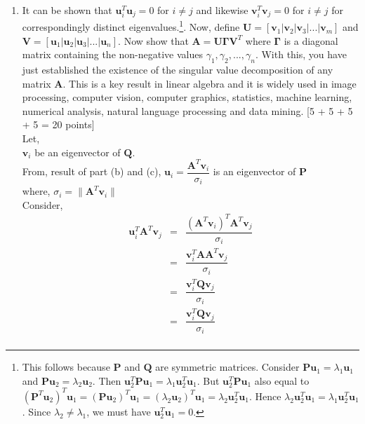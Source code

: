 \documentclass[11pt]{article}
\begin{document}
\begin{enumerate}
\item It can be shown that $\mathbf{u}^T_i \mathbf{u}_j = 0$ for $i \neq j$ and likewise $\mathbf{v}^T_i \mathbf{v}_j = 0$ for $i \neq j$ for correspondingly distinct eigenvalues.\footnote{This follows because $\mathbf{P}$ and $\mathbf{Q}$ are symmetric matrices. Consider $\mathbf{Pu}_1 = \lambda_1 \mathbf{u}_1$ and $\mathbf{Pu}_2 = \lambda_2 \mathbf{u}_2$. Then $\mathbf{u}^T_2 \mathbf{P u}_1 = \lambda_1 \mathbf{u}^T_2 \mathbf{u}_1$. But $\mathbf{u}^T_2 \mathbf{P} \mathbf{u}_1$ also equal to $(\mathbf{P}^T \mathbf{u}_2)^T \mathbf{u}_1 = (\mathbf{P} \mathbf{u}_2)^T \mathbf{u}_1 = (\lambda_2 \mathbf{u}_2)^T \mathbf{u}_1 = \lambda_2 \mathbf{u}^T_2 \mathbf{u}_1$. Hence $\lambda_2 \mathbf{u}^T_2 \mathbf{u}_1 = \lambda_1 \mathbf{u}^T_2 \mathbf{u}_1$. Since $\lambda_2 \neq \lambda_1$, we must have $\mathbf{u}^T_2 \mathbf{u}_1 = 0$. }. Now, define $\mathbf{U} = [\mathbf{v}_1 | \mathbf{v}_2 | \mathbf{v}_3 | ...|\mathbf{v}_m]$ and $\mathbf{V} = [\mathbf{u}_1 | \mathbf{u}_2 | \mathbf{u}_3 | ... |\mathbf{u}_n]$. Now show that $\mathbf{A} = \mathbf{U} \mathbf{\Gamma} \mathbf{V}^T$ where $\mathbf{\Gamma}$ is a diagonal matrix containing the non-negative values $\gamma_1, \gamma_2, ..., \gamma_n$. With this, you have just established the existence of the singular value decomposition of any matrix $\mathbf{A}$. This is a key result in linear algebra and it is widely used in image processing, computer vision, computer graphics, statistics, machine learning, numerical analysis, natural language processing and data mining. \textsf[5 + 5 + 5 + 5 = 20 points]\\
Let,\\ $\mathbf{v}_i$ be an eigenvector of $\mathbf{Q}$.\\
From, result of part (b) and (c), $\mathbf{u}_i = \dfrac{\mathbf{A}^T \mathbf{v}_i}{\sigma_i}$ is an eigenvector of $\mathbf{P}$\\
where, $\sigma_{i} = \|\mathbf{A}^T \mathbf{v}_i\|$\\
Consider,\\
\begin{eqnarray*}
\mathbf{u}_i^T \mathbf{A}^T \mathbf{v}_j &=& \dfrac{(\mathbf{A}^T\mathbf{v}_i)^T\mathbf{A}^T \mathbf{v}_j}{\sigma_{i}}\\
&=& \dfrac{\mathbf{v}_i^T\mathbf{A}\mathbf{A}^T \mathbf{v}_j}{\sigma_{i}} \\
&=& \dfrac{\mathbf{v}_i^T\mathbf{Q} \mathbf{v}_j}{\sigma_{i}} \\
&=& \dfrac{\mathbf{v}_i^T\mathbf{Q} \mathbf{v}_j}{\sigma_{i}} \\

\end{eqnarray*}
\end{enumerate}
\end{document}
